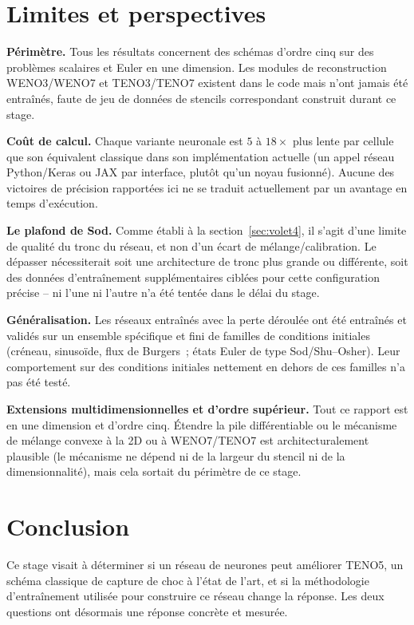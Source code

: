 \documentclass[11pt]{article}
\begin{document}
\section{Limites et perspectives}

\textbf{Périmètre.} Tous les résultats concernent des schémas d'ordre
cinq sur des problèmes scalaires et Euler en une dimension. Les modules de
reconstruction WENO3/WENO7 et TENO3/TENO7 existent dans le code mais
n'ont jamais été entraînés, faute de jeu de données de stencils
correspondant construit durant ce stage.

\textbf{Coût de calcul.} Chaque variante neuronale est $5$ à $18\times$
plus lente par cellule que son équivalent classique dans son
implémentation actuelle (un appel réseau Python/Keras ou JAX par
interface, plutôt qu'un noyau fusionné). Aucune des victoires de précision
rapportées ici ne se traduit actuellement par un avantage en temps
d'exécution.

\textbf{Le plafond de Sod.} Comme établi à la section~\ref{sec:volet4},
il s'agit d'une limite de qualité du tronc du réseau, et non d'un écart de
mélange/calibration. Le dépasser nécessiterait soit une architecture de
tronc plus grande ou différente, soit des données d'entraînement
supplémentaires ciblées pour cette configuration précise -- ni l'une ni
l'autre n'a été tentée dans le délai du stage.

\textbf{Généralisation.} Les réseaux entraînés avec la perte déroulée ont
été entraînés et validés sur un ensemble spécifique et fini de familles de
conditions initiales (créneau, sinusoïde, flux de Burgers~; états Euler de
type Sod/Shu--Osher). Leur comportement sur des conditions initiales
nettement en dehors de ces familles n'a pas été testé.

\textbf{Extensions multidimensionnelles et d'ordre supérieur.} Tout ce
rapport est en une dimension et d'ordre cinq. Étendre la pile
différentiable ou le mécanisme de mélange convexe à la 2D ou à
WENO7/TENO7 est architecturalement plausible (le mécanisme ne dépend ni
de la largeur du stencil ni de la dimensionnalité), mais cela sortait du
périmètre de ce stage.

\section{Conclusion}

Ce stage visait à déterminer si un réseau de neurones peut améliorer
TENO5, un schéma classique de capture de choc à l'état de l'art, et si la
méthodologie d'entraînement utilisée pour construire ce réseau change la
réponse. Les deux questions ont désormais une réponse concrète et
mesurée.
\end{document}
